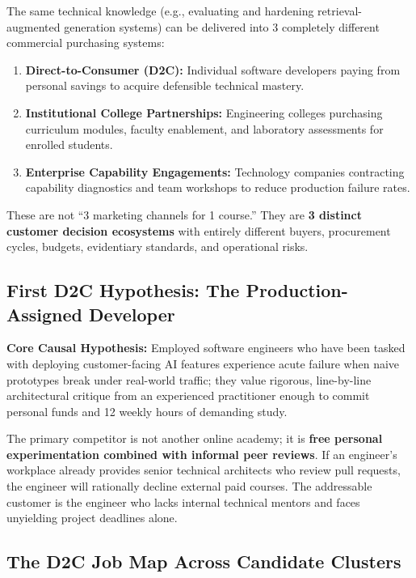 The same technical knowledge (e.g., evaluating and hardening retrieval-augmented generation systems) can be delivered into 3 completely different commercial purchasing systems:
\begin{enumerate}[leftmargin=1.2em,itemsep=0.2ex]
  \item \textbf{Direct-to-Consumer (D2C):} Individual software developers paying from personal savings to acquire defensible technical mastery.
  \item \textbf{Institutional College Partnerships:} Engineering colleges purchasing curriculum modules, faculty enablement, and laboratory assessments for enrolled students.
  \item \textbf{Enterprise Capability Engagements:} Technology companies contracting capability diagnostics and team workshops to reduce production failure rates.
\end{enumerate}
These are not ``3 marketing channels for 1 course.'' They are \textbf{3 distinct customer decision ecosystems} with entirely different buyers, procurement cycles, budgets, evidentiary standards, and operational risks.

\subsection{First D2C Hypothesis: The Production-Assigned Developer}

\noindent\textbf{Core Causal Hypothesis:} Employed software engineers who have been tasked with deploying customer-facing AI features experience acute failure when naive prototypes break under real-world traffic; they value rigorous, line-by-line architectural critique from an experienced practitioner enough to commit personal funds and 12 weekly hours of demanding study.

The primary competitor is not another online academy; it is \textbf{free personal experimentation combined with informal peer reviews}. If an engineer's workplace already provides senior technical architects who review pull requests, the engineer will rationally decline external paid courses. The addressable customer is the engineer who lacks internal technical mentors and faces unyielding project deadlines alone.

\subsection{The D2C Job Map Across Candidate Clusters}


